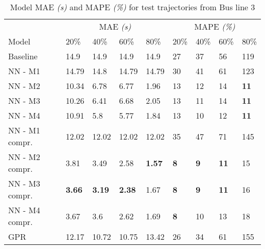 \begin{table}[H]
  \centering
  \caption{Model MAE \textit{(s)} and MAPE \textit{(\%)} for test trajectories from Bus line 3}
  \label{tbl:models-mae-and-mape-203}
  \begin{tabular}{l | l | l | l | l || l | l | l | l }
    & \multicolumn{4}{c}{MAE \textit{(s)}} & \multicolumn{4}{c}{MAPE \textit{(\%)}} \\
    Model      & 20\% & 40\% & 60\% & 80\% & 20\% & 40\% & 60\% & 80\% \\
    \hline
    Baseline & 14.9 & 14.9 & 14.9 & 14.9  & 27 & 37 & 56 & 119 \\
    NN - M1        & 14.79& 14.8& 14.79& 14.79& 30& 41& 61& 123 \\
    NN - M2        & 10.34& 6.78& 6.77& 1.96& 13& 12& 14& \textbf{11} \\
    NN - M3       & 10.26& 6.41& 6.68& 2.05& 13& 11& 14& \textbf{11}\\
    NN - M4        & 10.91& 5.8& 5.77& 1.84& 13& 10& 12& \textbf{11} \\
    NN - M1 compr.       & 12.02& 12.02& 12.02& 12.02& 35& 47& 71& 145 \\
    NN - M2 compr.       & 3.81& 3.49& 2.58& \textbf{1.57}& \textbf{8}& \textbf{9}& \textbf{11}& 15 \\
    NN - M3 compr.       & \textbf{3.66}& \textbf{3.19}& \textbf{2.38}& 1.67& \textbf{8}& \textbf{9}& \textbf{11}& 16 \\
    NN - M4 compr.       & 3.67& 3.6& 2.62& 1.69& \textbf{8} & 10& 13& 18 \\
    GPR        &  12.17 & 10.72 & 10.75 & 13.42 & 26 &  34 & 61 &  155  \\
  \end{tabular}
\end{table}

